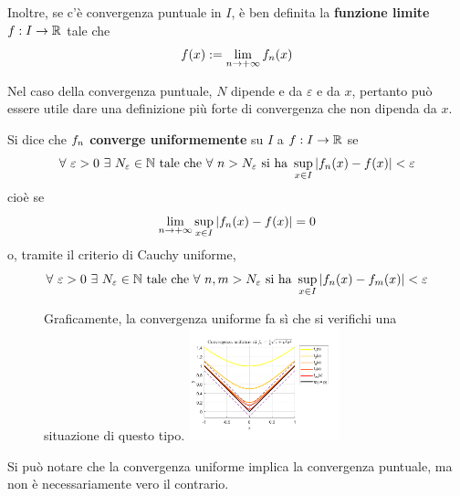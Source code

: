 \begin{definition} \label{Def: Funzione limite}
    Inoltre, se c'è convergenza puntuale in $I$, è ben definita la \textbf{funzione limite} $f: I \to \mathbb{R}$ tale che
    \begin{equation}
        f(x) := \lim_{n \to +\infty} f_n(x)
    \end{equation}
\end{definition}
Nel caso della convergenza puntuale, $N$ dipende e da $\varepsilon$ e da $x$, pertanto può essere utile dare una definizione più forte di convergenza che non dipenda da $x$.
\begin{definition} \label{Def: Convergenza uniforme succ}
    Si dice che $f_n$ \textbf{converge uniformemente} su $I$ a $f: I \to \mathbb{R}$ se
    \begin{equation}
        \forall\ \varepsilon>0\ \exists\ N_\varepsilon \in \N\ \text{tale che}\ \forall\ n>N_\varepsilon\ \text{si ha}\ \sup_{x \in I}|\fn(x)-f(x)| < \varepsilon
    \end{equation}
    cioè se
    \begin{equation}
    \lim_{n \to + \infty}{\sup_{x \in I} \left| f_n(x)-f(x)\right|}=0
    \end{equation}
    o, tramite il criterio di Cauchy uniforme,
    \begin{equation}
        \forall \ \varepsilon >0 \ \exists\ N_\varepsilon \in \N \ \text{tale che}\ \forall\ n,m > N_\varepsilon\ \text{si ha}\ \sup_{x \in I}{|\fn(x)-f_m(x)|}<\varepsilon
    \end{equation}
\end{definition}
\begin{figure}[H]
    Graficamente, la convergenza uniforme fa sì che si verifichi una situazione di questo tipo.
    \centering
        \includegraphics[width=0.39\textwidth]{Capitoli/Capitolo7/Convergenza uniforme.png}
\end{figure}
\begin{oss}
   Si può notare che la convergenza uniforme implica la convergenza puntuale, ma non è necessariamente vero il contrario.
    \end{oss}
